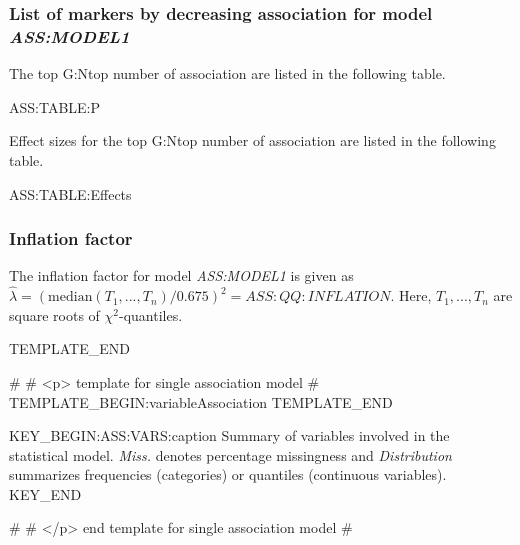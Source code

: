 \subsubsection{List of markers by decreasing association for model \emph{ASS:MODEL1}}

The top G:Ntop number of association are listed in the following table.

ASS:TABLE:P

Effect sizes for the top G:Ntop number of association are listed in the following table.

ASS:TABLE:Effects

\subsubsection{Inflation factor}

The inflation factor for model \emph{ASS:MODEL1} is given as $\hat \lambda = (\mathrm{median}(T_1, ..., T_n)/0.675)^2 = ASS:QQ:INFLATION$. Here, $T_1, ..., T_n$ are square roots of $\chi^2$-quantiles.

TEMPLATE_END

#
#	<p> template for single association model
#
TEMPLATE_BEGIN:variableAssociation
TEMPLATE_END

KEY_BEGIN:ASS:VARS:caption
Summary of variables involved in the statistical model. {\it Miss.} denotes percentage missingness and {\it Distribution} summarizes frequencies (categories) or quantiles (continuous variables).
KEY_END

#
#	</p> end template for single association model
#
